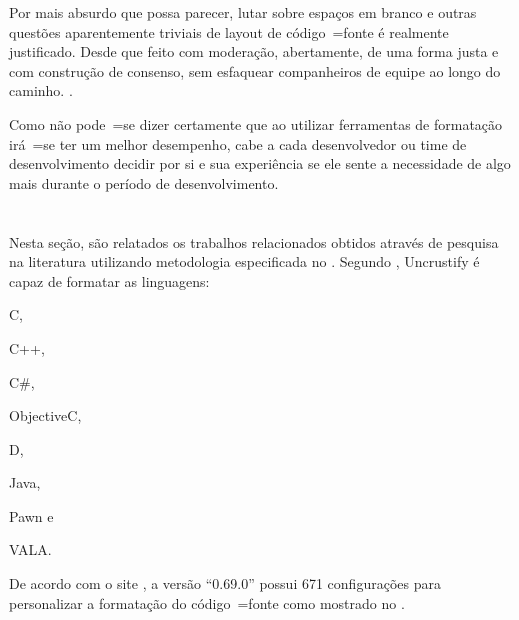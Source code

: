 %
\begin{citacao}
    Por mais absurdo que possa parecer,
    lutar sobre espaços em branco e
    outras questões aparentemente triviais de layout de código~=fonte é realmente justificado.
    Desde que feito com moderação,
    abertamente,
    de uma forma justa e
    com construção de consenso,
    sem esfaquear companheiros de equipe ao longo do caminho.
    \cite[tradução nossa\protect\footnotemark]{deathToTheSpaceInfidels}.
\end{citacao}

Como não pode~=se dizer certamente que ao utilizar ferramentas de formatação irá~=se ter um melhor desempenho,
cabe a cada desenvolvedor ou
time de desenvolvimento decidir por si e
sua experiência se ele sente a necessidade de algo mais durante o período de desenvolvimento.


\section{}
\label{trabalhosRelacionados}

Nesta seção,
são relatados os trabalhos relacionados obtidos através de pesquisa na literatura utilizando metodologia especificada no .
Segundo ,
Uncrustify é capaz de formatar as linguagens:
\begin{inparaenum}[1)]
\item C,
\item C++,
\item C\#,
\item ObjectiveC,
\item D,
\item Java,
\item Pawn e
\item VALA.
\end{inparaenum}%
De acordo com o site ,
a versão ``0.69.0'' possui 671 configurações para personalizar a formatação do código~=fonte como mostrado no .

